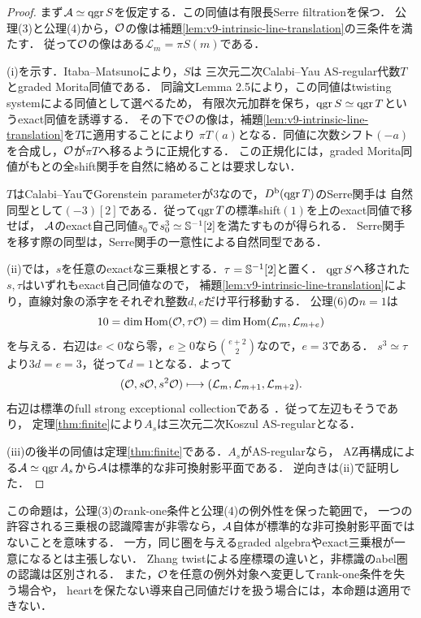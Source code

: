 \documentclass[11pt,a4paper]{ltjsarticle}
\begin{document}
\begin{proof}
まず$\mathcal A\simeq\operatorname{qgr} S$を仮定する．この同値は有限長Serre filtrationを保つ．
公理(3)と公理(4)から，$\mathcal O$の像は補題\ref{lem:v9-intrinsic-line-translation}の三条件を満たす．
従って$\mathcal O$の像はある$\mathcal L_m=\pi S(m)$である．

(i)を示す．Itaba--Matsuno\cite[Theorems 1.1, 4.4]{IM}により，$S$は
三次元二次Calabi--Yau AS-regular代数$T$とgraded Morita同値である．
同論文Lemma 2.5により，この同値はtwisting systemによる同値として選べるため，
有限次元加群を保ち，$\operatorname{qgr} S\simeq\operatorname{qgr} T$というexact同値を誘導する．
その下で$\mathcal O$の像は，補題\ref{lem:v9-intrinsic-line-translation}を$T$に適用することにより
$\pi T(a)$となる．同値に次数シフト$(-a)$を合成し，$\mathcal O$が$\pi T$へ移るように正規化する．
この正規化には，graded Morita同値がもとの全shift関手を自然に絡めることは要求しない．

$T$はCalabi--YauでGorenstein parameterが3なので，$D^{\mathrm b}(\operatorname{qgr} T)$のSerre関手は
自然同型として$(-3)[2]$である．従って$\operatorname{qgr} T$の標準shift$(1)$を上のexact同値で移せば，
$\mathcal A$のexact自己同値$s_0$で$s_0^3\simeq\mathbb S^{-1}[2]$を満たすものが得られる．
Serre関手を移す際の同型は，Serre関手の一意性による自然同型である．

(ii)では，$s$を任意のexactな三乗根とする．$\tau=\mathbb S^{-1}[2]$と置く．
$\operatorname{qgr} S$へ移された$s,\tau$はいずれもexact自己同値なので，
補題\ref{lem:v9-intrinsic-line-translation}により，直線対象の添字をそれぞれ整数$d,e$だけ平行移動する．
公理(6)の$n=1$は
\[
 10=\dim\operatorname{Hom}(\mathcal O,\tau\mathcal O)
   =\dim\operatorname{Hom}(\mathcal L_m,\mathcal L_{m+e})
\]
を与える．右辺は$e<0$なら零，$e\geq0$なら$\binom{e+2}{2}$なので，$e=3$である．
$s^3\simeq\tau$より$3d=e=3$，従って$d=1$となる．よって
\[
 (\mathcal O,s\mathcal O,s^2\mathcal O)\longmapsto
 (\mathcal L_m,\mathcal L_{m+1},\mathcal L_{m+2}).
\]
右辺は標準のfull strong exceptional collectionである
\cite[Theorem 7.1]{AOUCompact}．従って左辺もそうであり，
定理\ref{thm:finite}により$A_s$は三次元二次Koszul AS-regularとなる．

(iii)の後半の同値は定理\ref{thm:finite}である．$A_s$がAS-regularなら，
AZ再構成による$\mathcal A\simeq\operatorname{qgr} A_s$から$\mathcal A$は標準的な非可換射影平面である．
逆向きは(ii)で証明した．
\end{proof}

\begin{remark}[対象の認識と標識の分類]\label{rem:v9-marking-status}
この命題は，公理(3)のrank-one条件と公理(4)の例外性を保った範囲で，
一つの許容される三乗根の認識障害が非零なら，$\mathcal A$自体が標準的な非可換射影平面ではないことを意味する．
一方，同じ圏を与えるgraded algebraやexact三乗根が一意になるとは主張しない．
Zhang twistによる座標環の違いと，非標識のabel圏の認識は区別される．
また，$\mathcal O$を任意の例外対象へ変更してrank-one条件を失う場合や，
heartを保たない導来自己同値だけを扱う場合には，本命題は適用できない．
\end{remark}
\end{document}
